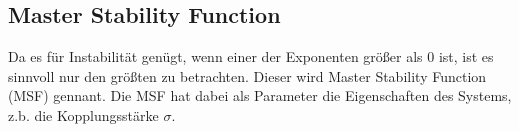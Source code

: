 \subsection{Master Stability Function}
Da es für Instabilität genügt, wenn einer der Exponenten größer als 0 ist, ist es sinnvoll nur den größten zu betrachten. Dieser wird Master Stability Function (MSF) gennant. Die MSF hat dabei als Parameter die Eigenschaften des Systems, z.b. die Kopplungsstärke $\sigma$.



